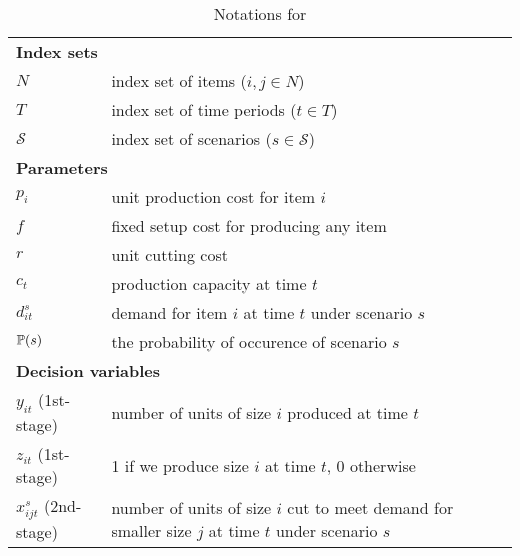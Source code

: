 \begin{table}[H]
	\caption{Notations for \sizes}
	\label{sizes:notation}
	\resizebox{\textwidth}{!}
	{
		\begin{tabular}{ll}
			\toprule
			\multicolumn{2}{l}{\textbf{Index sets}} \\
			$N$ & \textrm{index set of items ($i,j\in N$)} \\ 
			$T$ & \textrm{index set of time periods ($t\in T$)} \\ 
			$\mathcal{S}$ & \textrm{index set of scenarios ($s\in\mathcal{S}$)}\\ \midrule
			\multicolumn{2}{l}{\textbf{Parameters}} \\
			$p_{i}$ & unit production cost for item $i$\\
			$f$	& fixed setup cost for producing any item\\
			$r$ & unit cutting cost\\ 
			$c_{t}$ & production capacity at time $t$\\
			$d_{it}^s$ &	demand for item $i$ at time $t$ under scenario $s$\\
			$\operatorname*{\mathbb{P}}(s)$ & the probability of occurence of scenario $s$\\ \midrule
			\multicolumn{2}{l}{\textbf{Decision variables}} \\
			$y_{it}$ (1st-stage)  & number of units of size $i$ produced at time $t$ \\
			$z_{it}$ (1st-stage)& 1 if we produce size $i$ at time $t$, 0 otherwise\\
			$x_{ijt}^s$ (2nd-stage) & number of units of size $i$ cut to meet demand for smaller size $j$ at time $t$ under scenario $s$\\ 
			\bottomrule
		\end{tabular}
	}
\end{table} 

